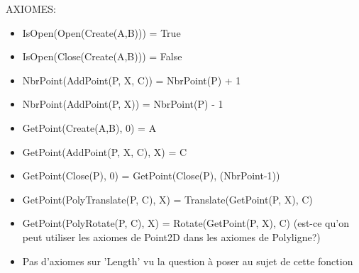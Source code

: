 \documentclass[a4paper, 11pt, oneside]{article}
\begin{document}
\noindent AXIOMES:
\begin{itemize}
    \item IsOpen(Open(Create(A,B))) = True
    \item IsOpen(Close(Create(A,B))) = False
    \item NbrPoint(AddPoint(P, X, C)) = NbrPoint(P) + 1
    \item NbrPoint(AddPoint(P, X)) = NbrPoint(P) - 1
    \item GetPoint(Create(A,B), 0) = A
    \item GetPoint(AddPoint(P, X, C), X) = C
    \item GetPoint(Close(P), 0) = GetPoint(Close(P), (NbrPoint-1))
    \item GetPoint(PolyTranslate(P, C), X) =  Translate(GetPoint(P, X), C)
    \item GetPoint(PolyRotate(P, C), X) =  Rotate(GetPoint(P, X), C)
    {\color{red} (est-ce qu'on peut utiliser les axiomes de Point2D dans les axiomes de Polyligne?)}
    \item {\color{red} Pas d'axiomes sur 'Length' vu la question à poser au sujet de cette fonction}
\end{itemize}
\end{document}
